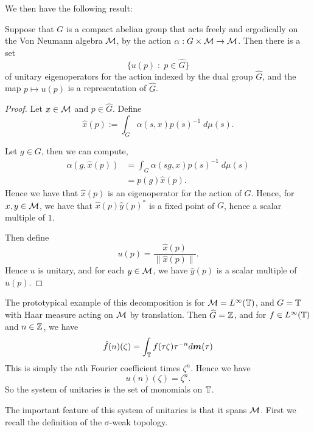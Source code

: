 We then have the following result:
\begin{proposition}
    Suppose that $G$ is a compact abelian group that acts freely and ergodically
    on the Von Neumann algebra $\mathcal{M}$, by the action $\alpha:G\times\mathcal{M}\rightarrow\mathcal{M}$. Then there is a set 
    \begin{equation}
        \{ u(p) \;:\; p \in \widehat{G}\}
    \end{equation}
    of unitary eigenoperators for the action indexed by the dual group $\widehat{G}$,
    and the map $p\mapsto u(p)$ is a representation of $\widehat{G}$.
\end{proposition}
\begin{proof}
    Let $x \in \mathcal{M}$ and $p \in \widehat{G}$. Define
    \begin{equation}
        \hat{x}(p) := \int_G \alpha(s,x) p(s)^{-1} \;d\mu(s).
    \end{equation}
    
    Let $g \in G$, then we can compute,
    \begin{align}
        \alpha(g,\hat{x}(p)) &= \int_G \alpha(sg,x)p(s)^{-1} \;d\mu(s)\\
        &= p(g)\hat{x}(p).
    \end{align}
    Hence we have that $\hat{x}(p)$ is an eigenoperator for the action of $G$.
    Hence, for $x,y \in \mathcal{M}$, we have that $\hat{x}(p)\hat{y}(p)^*$ is a fixed
    point of $G$, hence a scalar multiple of $1$. 
    
    Then define
    \begin{equation}
        u(p) = \frac{\hat{x}(p)}{\|\hat{x}(p)\|}.
    \end{equation}
    Hence $u$ is unitary, and for each $y \in \mathcal{M}$, we have $\hat{y}(p)$ is a scalar
    multiple of $u(p)$.
\end{proof} 
\begin{example}
    The prototypical example of this decomposition is for $\mathcal{M} = L^\infty(\mathbb{T})$,
    and $G = \mathbb{T}$ with Haar measure  acting on $\mathcal{M}$ by translation. Then $\widehat{G} = \mathbb{Z}$,
    and for $f \in L^\infty(\mathbb{T})$ and $n \in \mathbb{Z}$, we have
    \begin{equation}
        \hat{f}(n)(\zeta) = \int_{\mathbb{T}} f(\tau\zeta) \tau^{-n} d\boldsymbol{m}(\tau)
    \end{equation}
    This is simply the $n$th Fourier coefficient times $\zeta^n$. Hence we have
    \begin{equation}
        u(n)(\zeta) = \zeta^n.
    \end{equation}
    So the system of unitaries is the set of monomials on $\mathbb{T}$. 
\end{example}
The important feature of this system of unitaries is that it spans
$\mathcal{M}$. First we recall the definition of the $\sigma$-weak topology.

